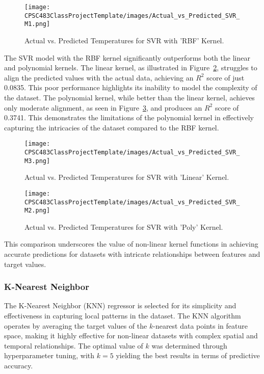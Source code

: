 \documentclass[conference]{IEEEtran}
\begin{document}
\begin{figure}[htbp]
\centering
\texttt{[image: CPSC483ClassProjectTemplate/images/Actual\_vs\_Predicted\_SVR\_M1.png]}
\caption{Actual vs. Predicted Temperatures for SVR with 'RBF' Kernel.}
\label{fig:SVR_plot_1}
\end{figure}
The SVR model with the RBF kernel significantly outperforms both the linear and polynomial kernels. The linear kernel, as illustrated in Figure~\ref{fig:SVR_plot_3}, struggles to align the predicted values with the actual data, achieving an \(R^2\) score of just 0.0835. This poor performance highlights its inability to model the complexity of the dataset. The polynomial kernel, while better than the linear kernel, achieves only moderate alignment, as seen in Figure~\ref{fig:SVR_plot_2}, and produces an \(R^2\) score of 0.3741. This demonstrates the limitations of the polynomial kernel in effectively capturing the intricacies of the dataset compared to the RBF kernel.

\begin{figure}[htbp]
\centering
\texttt{[image: CPSC483ClassProjectTemplate/images/Actual\_vs\_Predicted\_SVR\_M3.png]}
\caption{Actual vs. Predicted Temperatures for SVR with 'Linear' Kernel.}
\label{fig:SVR_plot_3}
\end{figure}

\begin{figure}[htbp]
\centering
\texttt{[image: CPSC483ClassProjectTemplate/images/Actual\_vs\_Predicted\_SVR\_M2.png]}
\caption{Actual vs. Predicted Temperatures for SVR with 'Poly' Kernel.}
\label{fig:SVR_plot_2}
\end{figure}

This comparison underscores the value of non-linear kernel functions in achieving accurate predictions for datasets with intricate relationships between features and target values.


\subsubsection{K-Nearest Neighbor}
The K-Nearest Neighbor (KNN) regressor is selected for its simplicity and effectiveness in capturing local patterns in the dataset. The KNN algorithm operates by averaging the target values of the \(k\)-nearest data points in feature space, making it highly effective for non-linear datasets with complex spatial and temporal relationships. The optimal value of \(k\) was determined through hyperparameter tuning, with \(k = 5\) yielding the best results in terms of predictive accuracy.
\end{document}
